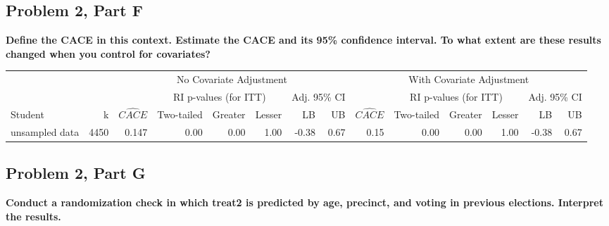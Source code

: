 \documentclass[11pt,notitlepage]{article}
\begin{document}
\subsection{Problem 2, Part F} {\bf Define the CACE in this context.  Estimate the CACE and its 95\% confidence interval.  To what extent are these results changed when you control for covariates?}

\vspace{1cm}

\begin{table}[h!]\scriptsize\onehalfspacing
\begin{center}
\begin{tabular}{lrrrrrrr|rrrrrr}
  \hline
  & & \multicolumn{6}{c|}{No Covariate Adjustment} & \multicolumn{6}{c}{With Covariate Adjustment} \\
  \cline{3-14}
  & & & \multicolumn{3}{c}{RI p-values (for ITT)} & \multicolumn{2}{c|}{Adj. 95\% CI} &  & \multicolumn{3}{c}{RI p-values (for ITT)} & \multicolumn{2}{c}{Adj. 95\% CI} \\
  \cline{4-6}\cline{10-12}
Student & k & $\widehat{CACE}$ & Two-tailed & Greater & Lesser & LB & UB & $\widehat{CACE}$ & Two-tailed & Greater & Lesser & LB & UB \\ 
  \hline
unsampled data & 4450 & 0.147 & 0.00 & 0.00 & 1.00 & -0.38 & 0.67 & 0.15 & 0.00 & 0.00 & 1.00 & -0.38 & 0.67 \\ 
   \hline
\end{tabular}
\end{center}
\end{table}





\clearpage

\subsection{Problem 2, Part G} {\bf Conduct a randomization check in which treat2 is predicted by age, precinct, and voting in previous elections.  Interpret the results.}

\vspace{1cm}
\end{document}
